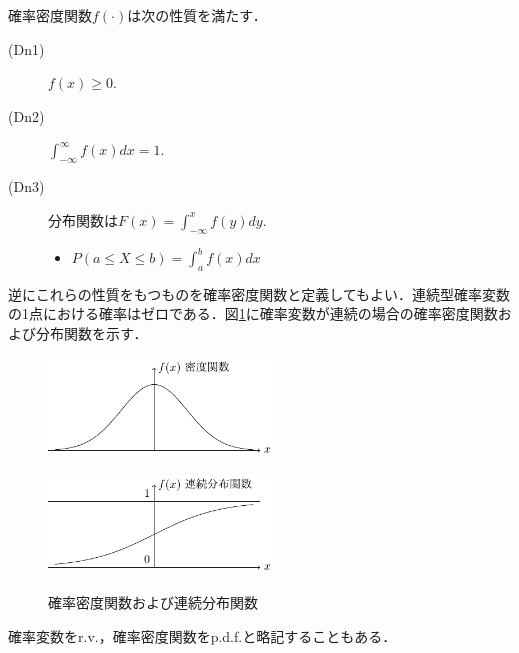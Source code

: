 \documentclass{jsreport}
\begin{document}
確率密度関数$f(\cdot)$は次の性質を満たす．
\begin{description}
  \item[(Dn1)] $f(x) \geq 0$.
  \item[(Dn2)] $\int_{-\infty}^{\infty} f(x) dx = 1$.
  \item[(Dn3)] 分布関数は$F(x) = \int_{-\infty}^x f(y) dy$.
  \begin{itemize}
    \item $P(a \leq X \leq b) = \int_{a}^b f(x) dx$
  \end{itemize}
\end{description}
逆にこれらの性質をもつものを確率密度関数と定義してもよい．連続型確率変数の1点における確率はゼロである．図\ref{fig:con}に確率変数が連続の場合の確率密度関数および分布関数を示す．
\begin{figure}[htb]
  \begin{minipage}[b]{0.5\linewidth}
    \centering
    \includegraphics[clip, width=6cm]{../figure/cpf.pdf}
    \label{fig:cpf}
  \end{minipage}
  \begin{minipage}[b]{0.5\linewidth}
    \centering
    \includegraphics[clip, width=6cm]{../figure/cpdf.pdf}
    \label{fig:cpdf}
  \end{minipage}
  \caption{確率密度関数および連続分布関数}\label{fig:con}
\end{figure}

確率変数をr.v.，確率密度関数をp.d.f.と略記することもある．
\end{document}
